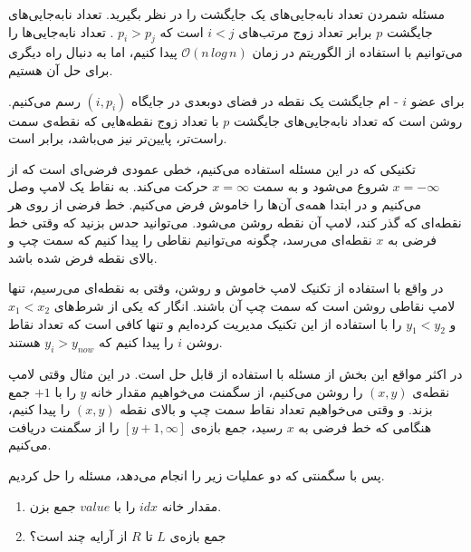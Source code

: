 \def\problemCode{\LR{inversions}}
\def\problemFarsiTitle{نابه‌جایی}

\begin{problem}

  مسئله شمردن تعداد نابه‌جایی‌های یک جایگشت را در نظر بگیرید.
  تعداد نابه‌جایی‌های جایگشت 
  $p$
  برابر تعداد زوج مرتب‌های
  $i < j$
  است که
  $p_i > p_j$
  .
  تعداد نابه‌جایی‌ها را می‌توانیم با استفاده از الگوریتم
  در زمان
  $\mathcal{O}(n \, log \, n)$
  پیدا کنیم، اما به دنبال راه دیگری برای حل آن هستیم.

  برای عضو
  $i$
  -
  ام جایگشت یک نقطه در فضای دوبعدی در جایگاه
  $(i, p_i)$
  رسم می‌کنیم.
  روشن است که 
  تعداد نابه‌جایی‌های جایگشت
  $p$
  با تعداد زوج نقطه‌هایی که 
  نقطه‌ی سمت راست‌تر، پایین‌تر نیز می‌باشد، برابر است.

  

  تکنیکی که در این مسئله استفاده می‌کنیم، 
  خطی عمودی فرضی‌ای است که از
  $x = -\infty$
  شروع می‌شود و به سمت
  $x = \infty$
  حرکت می‌کند.
  به نقاط یک لامپ وصل می‌کنیم و 
  در ابتدا همه‌ی آن‌ها را خاموش فرض می‌کنیم.
  خط فرضی از روی هر نقطه‌ای که گذر کند، 
  لامپ آن نقطه روشن می‌شود.
  می‌توانید حدس بزنید که وقتی خط فرضی به 
  $x$
  نقطه‌ای می‌رسد، 
  چگونه می‌توانیم نقاطی را پیدا کنیم 
  که سمت چپ و بالای نقطه فرض شده باشد.

  در واقع با استفاده از تکنیک لامپ خاموش و روشن، 
  وقتی به نقطه‌ای می‌رسیم، تنها لامپ نقاطی روشن است 
  که سمت چپ آن باشند. انگار که یکی از شرط‌های
  $x_1 < x_2$
  و
  $y_1 < y_2$
  را با استفاده از این تکنیک مدیریت کرده‌ایم و 
  تنها کافی است که تعداد نقاط روشن
  $i$
  را پیدا کنیم که
  $y_i > y_{now}$
  هستند.

  در اکثر مواقع این بخش از مسئله با استفاده از 
  قابل حل است. در این مثال وقتی لامپ نقطه‌ی 
  $(x, y)$
  را روشن می‌کنیم،
  از سگمنت می‌خواهیم
  مقدار خانه
  $y$
  را با 
  $+1$
  جمع بزند.
  و وقتی می‌خواهیم تعداد نقاط سمت چپ و بالای نقطه
  $(x, y)$
  را پیدا کنیم،
  هنگامی که خط فرضی به 
  $x$
  رسید،
  جمع بازه‌ی 
  $[y + 1, \infty]$
  را از سگمنت دریافت می‌کنیم.

  پس با سگمنتی که دو عملیات زیر را انجام می‌دهد، مسئله را حل کردیم.
  \begin{enumerate}
    \item
      مقدار خانه
      $idx$
      را با
      $value$
      جمع بزن.
    
    \item
      جمع بازه‌ی
      $L$
      تا
      $R$
      از آرایه چند است؟
  \end{enumerate}
\end{problem}
